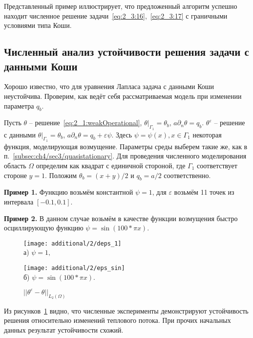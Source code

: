 Представленный пример иллюстрирует, что предложенный
алгоритм успешно находит численное решение
задачи~\eqref{eq:2_3:16},~\eqref{eq:2_3:17} с граничными
условиями типа Коши.

\subsection{Численный анализ устойчивости решения задачи с данными Коши}
\label{subsec:ch4/sec3/robustness}
Хорошо известно, что для уравнения Лапласа задача с данными Коши неустойчива.
Проверим, как ведёт себя рассматриваемая модель при изменении параметра $q_b$.

Пусть $\theta$ -- решение~\eqref{eq:2_1:weakOperational},
$\theta|_{\Gamma_1} = \theta_b$, $a\partial_n \theta = q_b$.
$\theta^\varepsilon$ -- решение с данными
$\theta|_{\Gamma_1} = \theta_b$, $a\partial_n \theta = q_b +\varepsilon \psi$.
Здесь $\psi = \psi(x), x \in \Gamma_1$ некоторая функция, моделирующая возмущение.
Параметры среды выберем такие же, как в п.~\ref{subsec:ch4/sec3/quasistationary}.
Для проведения численного моделирования область $\Omega$ определим
как квадрат с единичной стороной, где $\Gamma_1$ соответствует стороне $y = 1$.
Положим $\theta_b = (x + y) / 2$ и $q_b = a / 2$ соответственно.

\textbf{Пример 1.}
Функцию возьмём константной $\psi = 1$, для $\varepsilon$ возьмём 11 точек из интервала
$[-0.1, 0.1]$.


\textbf{Пример 2.}
В данном случае возьмём в качестве функции возмущения быстро осциллирующую функцию
$\psi = \sin (100 * \pi x)$.
\begin{figure}[h!t]
    \begin{minipage}[b][][b]{0.49\linewidth}
        \centering
        \texttt{[image: additional/2/deps\_1]}\\ а) $\psi = 1,$
    \end{minipage}
    \hfill
    \begin{minipage}[b][][b]{0.49\linewidth}
        \centering
        \texttt{[image: additional/2/eps\_sin]} \\ б) $\psi = \sin (100 * \pi x)$.
    \end{minipage}
    \caption{$||\theta^\varepsilon - \theta||_{L_2(\Omega)}$}
    \label{fig:4_3:vareps}
\end{figure}

Из рисунков~\ref{fig:4_3:vareps} видно, что численные эксперименты демонстрируют
устойчивость решения относительно изменений теплового потока.
При прочих начальных данных результат устойчивости схожий.


